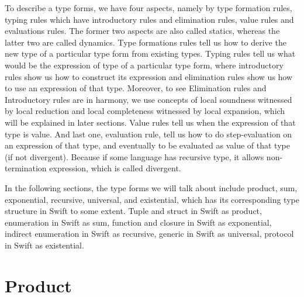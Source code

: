 \documentclass{article}
\begin{document}
To describe a type forms, we have four aspects, namely by type formation rules, typing rules which have introductory rules and elimination rules, value rules and evaluations rules. The former two aspects are also called statics, whereas the latter two are called dynamics. Type formations rules tell us how to derive the new type of a particular type form from existing types. Typing rules tell us what would be the expression of type of a particular type form, where introductory rules show us how to construct its expression and elimination rules show us how to use an expression of that type. Moreover, to see Elimination rules and Introductory rules are in harmony, we use concepts of local soundness witnessed by local reduction and local completeness witnessed by local expansion, which will be explained in later sections. Value rules tell us when the expression of that type is value. And last one, evaluation rule, tell us how to do step-evaluation on an expression of that type, and eventually to be evaluated as value of that type (if not divergent). Because if some language has recursive type, it allows non-termination expression, which is called divergent.


In the following sections, the type forms we will talk about include product, sum, exponential, recursive, universal, and existential, which has its corresponding type structure in Swift to some extent. Tuple and struct in Swift as product, enumeration in Swift as sum, function and closure in Swift as exponential, indirect enumeration in Swift as recursive, generic in Swift as universal, protocol in Swift as existential.

\section{Product}
\end{document}
